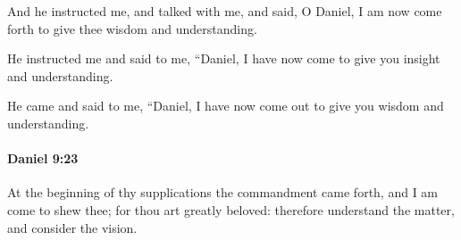 			\begin{versebox}
					\item[BHS] 
					\item[LXX] 
					\item[ASV] And he instructed me, and talked with me, and said, O Daniel, I am now come forth to give thee wisdom and understanding.
					\item[NIV] He instructed me and said to me, “Daniel, I have now come to give you insight and understanding.
					\item[NRSV] He came and said to me, “Daniel, I have now come out to give you wisdom and understanding.
			\end{versebox}

		\paragraph{Daniel 9:23} %
			\label{DANIEL-9-23}

			At the beginning of thy supplications the commandment came forth, and I am come to shew thee; for thou art greatly beloved: therefore understand the matter, and consider the vision.

